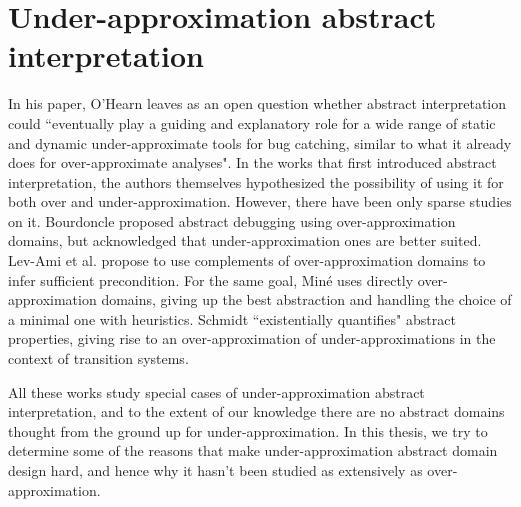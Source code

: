 \section{Under-approximation abstract interpretation}
In his paper, O'Hearn leaves as an open question whether abstract interpretation could ``eventually play a guiding and explanatory role for a wide range of static and dynamic under-approximate tools for bug catching, similar to what it already does for over-approximate analyses".
In the works that first introduced abstract interpretation, the authors themselves hypothesized the possibility of using it for both over and under-approximation. However, there have been only sparse studies on it.
Bourdoncle \cite{bourdoncle-abs-debugging} proposed abstract debugging using over-approximation domains, but acknowledged that under-approximation ones are better suited.
Lev-Ami et al. \cite{lev-backward-analysis-complement} propose to use complements of over-approximation domains to infer sufficient precondition.
For the same goal, Miné \cite{mine-backward-underapprox-14} uses directly over-approximation domains, giving up the best abstraction and handling the choice of a minimal one with heuristics.
Schmidt \cite{schmidt-higher-order-approx-2007} ``existentially quantifies" abstract properties, giving rise to an over-approximation of under-approximations in the context of transition systems.

All these works study special cases of under-approximation abstract interpretation, and to the extent of our knowledge there are no abstract domains thought from the ground up for under-approximation. In this thesis, we try to determine some of the reasons that make under-approximation abstract domain design hard, and hence why it hasn't been studied as extensively as over-approximation.

